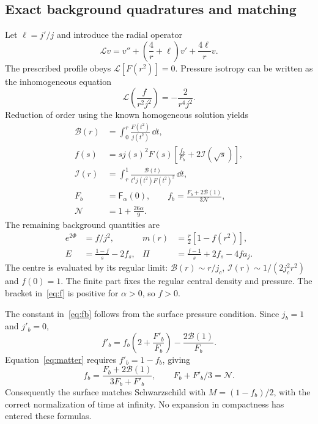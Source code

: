 \subsection{Exact background quadratures and matching}
Let $\ell=j'/j$ and introduce the radial operator
\begin{equation}
 \mathcal L v=v''+\left(\frac4r+\ell\right)v'+\frac{4\ell}{r}v.
\end{equation}
The prescribed profile obeys $\mathcal L[F(r^2)]=0$. Pressure isotropy can be written as the inhomogeneous equation
\begin{equation}
 \mathcal L\left(\frac{f}{r^2j^2}\right)=-\frac{2}{r^4j^2}.
 \label{eq:isotropy}
\end{equation}
Reduction of order using the known homogeneous solution yields
\begin{align}
 \mathcal B(r)&=\int_0^r\frac{F(t^2)}{j(t^2)}\,\dd t,\label{eq:B}\\
 f(s)&=s j(s)^2F(s)\left[\frac{f_b}{F_b}+2\mathcal I(\sqrt s)\right],\label{eq:f}\\
 \mathcal I(r)&=\int_r^1\frac{\mathcal B(t)}{t^4j(t^2)F(t^2)^2}\,\dd t,\label{eq:integral}\\
 F_b&=\mathsf F_\alpha(0),\qquad
 f_b=\frac{F_b+2\mathcal B(1)}{3\mathcal N},\label{eq:fb}\\
 \mathcal N&=1+\frac{26\alpha}{9}.\label{eq:norm}
\end{align}
The remaining background quantities are
\begin{align}
 e^{2\Phi}&=f/j^2, &m(r)&=\frac r2[1-f(r^2)],\label{eq:background}\\
 E&=\frac{1-f}{s}-2f_s,&
 \Pi&=\frac{f-1}{s}+2f_s-4fa_j.\label{eq:matter}
\end{align}
The centre is evaluated by its regular limit: $\mathcal B(r)\sim r/j_c$, $\mathcal I(r)\sim1/(2j_c^2r^2)$ and $f(0)=1$. The finite part fixes the regular central density and pressure. The bracket in~\eqref{eq:f} is positive for $\alpha>0$, so $f>0$.

The constant in~\eqref{eq:fb} follows from the surface pressure condition. Since $j_b=1$ and $j'_b=0$,
\begin{equation}
 f'_b=f_b\left(2+\frac{F'_b}{F_b}\right)-\frac{2\mathcal B(1)}{F_b}.
\end{equation}
Equation~\eqref{eq:matter} requires $f'_b=1-f_b$, giving
\begin{equation}
 f_b=\frac{F_b+2\mathcal B(1)}{3F_b+F'_b},
 \qquad F_b+F'_b/3=\mathcal N.
\end{equation}
Consequently the surface matches Schwarzschild with $M=(1-f_b)/2$, with the correct normalization of time at infinity. No expansion in compactness has entered these formulas.

